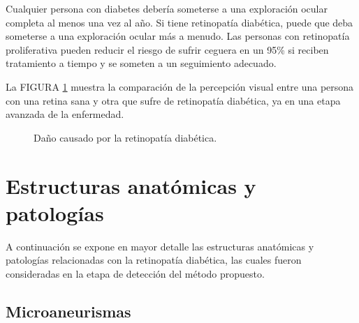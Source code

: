 Cualquier persona con diabetes debería someterse a una exploración ocular completa al menos una vez al año. Si tiene retinopatía diabética, puede que deba someterse a una exploración ocular más a menudo. Las personas con retinopatía proliferativa pueden reducir el riesgo de sufrir ceguera en un 95\% si reciben tratamiento a tiempo y se someten a un seguimiento adecuado. %

La FIGURA \ref{fig:sinvscon1} muestra la comparación de la percepción visual entre  una persona con una retina sana y otra que sufre de retinopatía diabética, ya en una etapa avanzada de la enfermedad.
\begin{figure}[H]
\centering
{}
\caption{Daño causado por la retinopatía diabética.} 
\label{fig:sinvscon1}
\end{figure}
\section{Estructuras anatómicas y patologías}
A continuación se expone en mayor detalle las estructuras anatómicas y patologías relacionadas con la retinopatía diabética, las cuales fueron consideradas en la etapa de detección del método propuesto.

\subsection{Microaneurismas}

